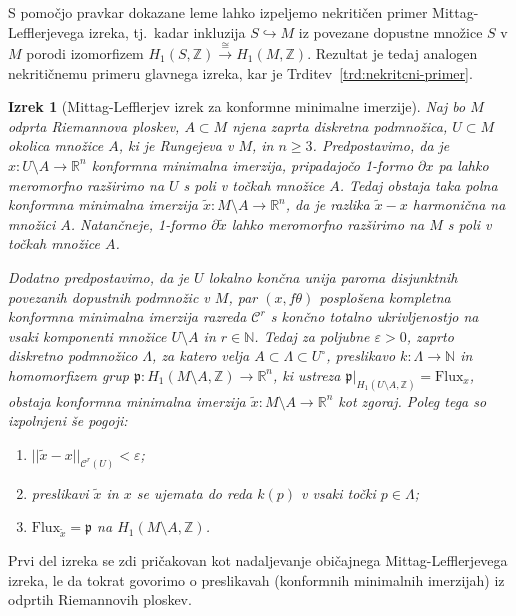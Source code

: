 \documentclass[12pt,a4paper,twoside]{article}
\theoremstyle{definition} %
\theoremstyle{plain} %
\newtheorem{izrek}[definicija]{Izrek}
\numberwithin{equation}{section}  %
\newcommand{\R}{\mathbb R}
\newcommand{\N}{\mathbb N}
\newcommand{\Z}{\mathbb Z}
\begin{document}
S pomočjo pravkar dokazane leme lahko izpeljemo nekritičen primer Mittag-Lefflerjevega izreka, tj.~kadar inkluzija $S \hookrightarrow M$ iz povezane dopustne množice $S$ v $M$ porodi izomorfizem $H_{1}(S,\Z) \stackrel{\cong}{\longrightarrow} H_{1}(M,\Z)$. Rezultat je tedaj analogen nekritičnemu primeru glavnega izreka, kar je Trditev~\ref{trd:nekritcni-primer}.

\begin{izrek} [Mittag-Lefflerjev izrek za konformne minimalne imerzije] \label{izr:ML-CMI}
Naj bo $M$ odprta Riemannova ploskev, $A \subset M$ njena zaprta diskretna podmnožica, $U \subset M$ okolica množice $A$, ki je Rungejeva v $M$, in $n \geq 3$.
Predpostavimo, da je $x \colon U \setminus A \to \R^{n}$ konformna minimalna imerzija, pripadajočo 1-formo $\partial x$ pa lahko meromorfno razširimo na $U$ s poli v točkah množice $A$.
Tedaj obstaja taka polna konformna minimalna imerzija $\tilde{x} \colon M \setminus A \to \R^{n}$, da je razlika $\tilde{x}-x$ harmonična na množici $A$.
Natančneje, 1-formo $\partial \tilde{x}$ lahko meromorfno razširimo na $M$ s poli v točkah množice $A$.

Dodatno predpostavimo, da je $U$ lokalno končna unija paroma disjunktnih povezanih dopustnih podmnožic v $M$, par $(x, f\theta)$ posplošena kompletna konformna minimalna imerzija razreda $\mathcal{C}^{r}$ s končno totalno ukrivljenostjo na vsaki komponenti množice $U \setminus A$ in $r \in \N$.
Tedaj za poljubne $\varepsilon > 0$, zaprto diskretno podmnožico $\Lambda$, za katero velja $A \subset \Lambda \subset U^{\circ}$, preslikavo $k \colon \Lambda \to \N$ in homomorfizem grup $\mathfrak{p} \colon H_{1}(M \setminus A, \Z) \to \R^{n}$, ki ustreza $\mathfrak{p}|_{H_{1}(U \setminus A, \Z)} = \mathrm{Flux}_{x}$, obstaja konformna minimalna imerzija $\tilde{x} \colon M \setminus A \to \R^{n}$ kot zgoraj. Poleg tega so izpolnjeni še pogoji:
\begin{enumerate}
\item $||\tilde{x}-x||_{\mathcal{C}^{r}(U)} < \varepsilon$;
\item preslikavi $\tilde{x}$ in $x$ se ujemata do reda $k(p)$ v vsaki točki $p \in \Lambda$;
\item $\mathrm{Flux}_{\tilde{x}} = \mathfrak{p}$ na $H_{1}(M \setminus A, \Z)$.
\end{enumerate}
\end{izrek}

Prvi del izreka se zdi pričakovan kot nadaljevanje običajnega Mittag-Lefflerjevega izreka, le da tokrat govorimo o preslikavah (konformnih minimalnih imerzijah) iz odprtih Riemannovih ploskev.
\end{document}

